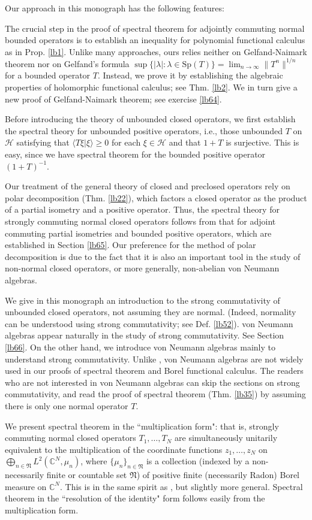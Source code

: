 \documentclass[12pt,a4paper,notitlepage]{article}
\theoremstyle{definition}
\theoremstyle{plain}
\newcommand{\fk}{\mathfrak}
\newcommand{\mc}{\mathcal}
\newcommand{\bk}[1]{\langle {#1}\rangle}
\newcommand{\Cbb}{\mathbb C}
\newcommand{\Sp}{\mathrm{Sp}}
\numberwithin{equation}{section}
\begin{document}
Our approach in this monograph has the following features:

The crucial step in the proof of spectral theorem for adjointly commuting normal bounded operators is to establish an inequality for polynomial functional calculus as in Prop. \ref{lb1}. Unlike many approaches, ours relies neither on Gelfand-Naimark theorem nor on Gelfand's formula $\sup\{|\lambda|:\lambda\in\Sp(T)\}=\lim_{n\rightarrow\infty}\lVert T^n\lVert^{1/n}$ for a bounded operator $T$. Instead, we prove it by establishing the algebraic properties of holomorphic functional calculus; see Thm. \ref{lb2}. We in turn give a new proof of Gelfand-Naimark theorem; see exercise \ref{lb64}.

Before introducing the theory of unbounded closed operators, we first establish the spectral theory for unbounded positive operators, i.e., those unbounded $T$ on $\mc H$ satisfying that $\bk{T\xi|\xi}\geq 0$ for each $\xi\in\mc H$ and that $1+T$ is surjective. This is easy, since we have spectral theorem for the bounded positive operator $(1+T)^{-1}$.

Our treatment of the general theory of closed and preclosed operators rely on polar decomposition (Thm. \ref{lb22}), which factors a closed operator as the product of a partial isometry and a positive operator. Thus, the spectral theory for strongly commuting normal closed operators follows from that for adjoint commuting partial isometries and bounded positive operators, which are established in Section \ref{lb65}. Our preference for the method of polar decomposition is due to the fact that it is also an important tool in the study of non-normal closed operators, or more generally, non-abelian von Neumann algebras.

We give in this monograph an introduction to the strong commutativity of unbounded closed operators, not assuming they are normal. (Indeed, normality can be understood using strong commutativity; see Def. \ref{lb52}). von Neumann algebras appear naturally in the study of strong commutativity. See Section \ref{lb66}. On the other hand, we introduce von Neumann algebras mainly to understand strong commutativity. Unlike \cite{Kad}, von Neumann algebras are not widely used in our proofs of spectral theorem and Borel functional calculus. The readers who are not interested in von Neumann algebras can skip the sections on strong commutativity, and read the proof of spectral theorem (Thm. \ref{lb35})  by assuming there  is only one normal operator $T$.

We present spectral theorem in the ``multiplication form": that is, strongly commuting normal closed operators $T_1,\dots,T_N$ are simultaneously unitarily equivalent to the multiplication of the coordinate functions $z_1,\dots,z_N$ on $\bigoplus_{n\in\fk N} L^2(\Cbb^N,\mu_n)$, where $\{\mu_n\}_{n\in\fk N}$ is a collection (indexed by a non-necessarily finite or countable set $\fk N$) of positive finite (necessarily Radon) Borel measure on $\Cbb^N$. This is in the same spirit as \cite{RS}, but slightly more general. Spectral theorem in the ``resolution of the identity" form follows easily from the multiplication form.
\end{document}

